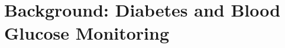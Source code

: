 
\chapter{Background: Diabetes and Blood Glucose Monitoring}
\label{cha:Background Diabetes and Blood Glucose Monitoring}